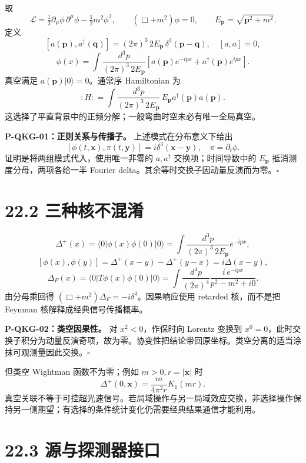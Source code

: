 \documentclass[
  11pt,
  oneside]{book}
\begin{document}
取 \[
\mathcal L=\tfrac12\partial_\mu\phi\,\partial^\mu\phi-\tfrac12m^2\phi^2,\qquad
(\Box+m^2)\phi=0,\qquad E_{\mathbf p}=\sqrt{\mathbf p^2+m^2}.
\] 定义 \[
[a(\mathbf p),a^\dagger(\mathbf q)]=(2\pi)^3\,2E_{\mathbf p}\,
\delta^3(\mathbf p-\mathbf q),\quad [a,a]=0,
\] \[
\phi(x)=\int\frac{d^3p}{(2\pi)^3\,2E_{\mathbf p}}
\left[a(\mathbf p)e^{-ipx}+a^\dagger(\mathbf p)e^{ipx}\right].
\] 真空满足 \(a(\mathbf p)|0\rangle=0\)。通常序 Hamiltonian 为 \[
:H: =\int\frac{d^3p}{(2\pi)^3\,2E_{\mathbf p}}\,
E_{\mathbf p}a^\dagger(\mathbf p)a(\mathbf p).
\] 这选择了平直背景中的正频分解；一般弯曲时空未必有唯一全局真空。

\protect\hypertarget{p-qkg-01}{}{}

\textbf{P-QKG-01：正则关系与传播子。} 上述模式在分布意义下给出 \[
[\phi(t,\mathbf x),\pi(t,\mathbf y)]=i\delta^3(\mathbf x-\mathbf y),
\quad \pi=\partial_t\phi.
\] 证明是将两组模式代入，使用唯一非零的 \(a,a^\dagger\)
交换项；时间导数中的 \(E_{\mathbf p}\) 抵消测度分母，两项各给一半
Fourier delta。其余等时交换子因动量反演而为零。\(\square\)

\section{22.2 三种核不混淆}

\[
\Delta^+(x)=\langle0|\phi(x)\phi(0)|0\rangle
=\int\frac{d^3p}{(2\pi)^3\,2E_{\mathbf p}}e^{-ipx},
\] \[
[\phi(x),\phi(y)]=\Delta^+(x-y)-\Delta^+(y-x)=i\Delta(x-y),
\] \[
\Delta_F(x)=\langle0|T\phi(x)\phi(0)|0\rangle
=\int\frac{d^4p}{(2\pi)^4}\frac{i\,e^{-ipx}}{p^2-m^2+i0}.
\] 由分母乘回得 \((\Box+m^2)\Delta_F=-i\delta^4\)。因果响应使用 retarded
核，而不是把 Feynman 核解释成经典信号传播概率。

\protect\hypertarget{p-qkg-02}{}{}

\textbf{P-QKG-02：类空因果性。} 对 \(x^2<0\)，作保时向 Lorentz 变换到
\(x^0=0\)，此时交换子积分为动量反演奇项，故为零。协变性把结论带回原坐标。类空分离的适当涂抹可观测量因此交换。\(\square\)

但类空 Wightman 函数不为零；例如 \(m>0,r=|\mathbf x|\) 时 \[
\Delta^+(0,\mathbf x)=\frac{m}{4\pi^2r}K_1(mr).
\]
真空关联不等于可控超光速信号。若局域操作与另一局域效应交换，非选择操作保持另一侧期望；有选择的条件统计变化仍需要经典结果通信才能利用。

\section{22.3 源与探测器接口}
\end{document}
